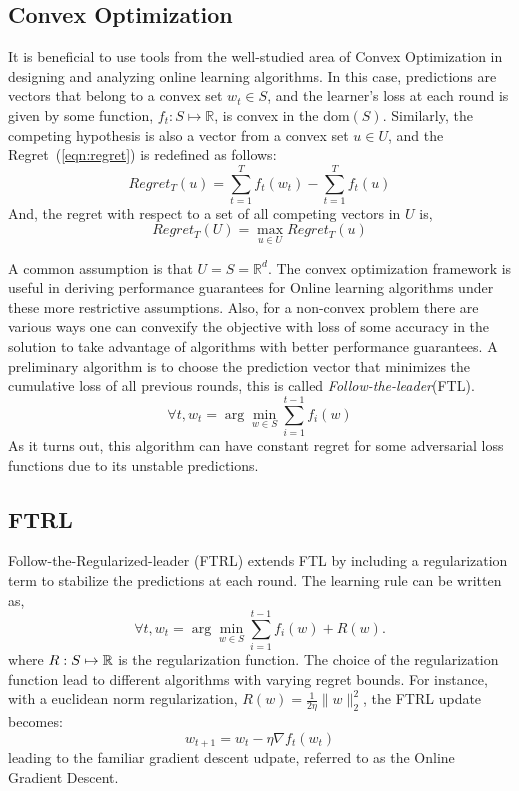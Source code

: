 \subsection{Convex Optimization}
It is beneficial to use tools from the well-studied area of Convex Optimization in designing and
analyzing online learning algorithms.
In this case, predictions are vectors that belong to a convex set $w_t \in S$, and the learner's
loss at each round is given by some function, $f_t: S \mapsto \mathbb{R}$, is convex in the
$\text{dom}(S)$.
Similarly, the competing hypothesis is also a vector from a convex set $u \in U$, and the
Regret~(\ref{eqn:regret}) is redefined as follows:
\begin{equation}
	Regret_T(u) = \sum_{t=1}^T
	f_t(w_t) - \sum_{t=1}^T f_t(u)
\end{equation} And, the regret with respect to a set of all
competing vectors in $U$ is,
\begin{equation}
	Regret_T(U) = \max_{u \in U} Regret_T(u)
\end{equation}

A common assumption is that $U=S=\mathbb{R}^d$.
The convex optimization framework is useful in deriving performance guarantees for Online learning
algorithms under these more restrictive assumptions.
Also, for a non-convex problem there are various ways one can convexify the objective with loss of
some accuracy in the solution to take advantage of algorithms with better performance guarantees.
A preliminary algorithm is to choose the prediction vector that minimizes the cumulative loss of
all previous rounds, this is called \textit{Follow-the-leader}(FTL).
$$ \forall t, w_t = \arg \min_{w \in S} \sum_{i=1}^{t-1} f_i(w)$$
As it turns out, this algorithm can have constant regret for some
adversarial loss functions due to its unstable predictions.

\subsection{FTRL}\label{sec:ftrl}
Follow-the-Regularized-leader (FTRL) extends FTL by including a regularization term to stabilize
the predictions at each round.
The learning rule can be written as, $$\forall t, w_t = \arg \min_{w \in S} \sum_{i=1}^{t-1} f_i(w)
	+ R(w).
$$
where $R: S \mapsto \mathbb{R}$ is the regularization function.
The choice of the regularization function lead to different algorithms with varying regret bounds.
For instance, with a euclidean norm regularization, $R(w) = \frac{1}{2 \eta} \|w\|_2^2$, the FTRL
update becomes:
\begin{equation}
	w_{t+1} = w_t - \eta \nabla f_t(w_t)
\end{equation} leading to the
familiar gradient descent udpate, referred to as the Online Gradient Descent.

